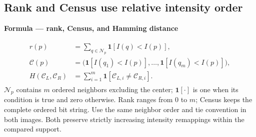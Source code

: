 \documentclass[letterpaper,11pt,english,openany,oneside]{jupyterBook}
\begin{document}
\subsection{Rank and Census use relative intensity order}
\label{\detokenize{lectures/lecture04/matching:rank-and-census-use-relative-intensity-order}}
\ignorespaces
{}\ignorespaces
{}\ignorespaces
\begin{TextbookBox}
\textbf{Formula — rank, Census, and Hamming distance}\par\smallskip
\begin{equation}\label{equation:lectures/lecture04/matching:eq-lec04-census}
\begin{split}\begin{aligned}
r(p)&=\sum_{q\in\mathcal N_p}\mathbf1[I(q)<I(p)],\\
\mathcal C(p)&=\bigl(\mathbf1[I(q_1)<I(p)],\ldots,
\mathbf1[I(q_m)<I(p)]\bigr),\\
H(\mathcal C_L,\mathcal C_R)&=\sum_{i=1}^{m}\mathbf1[\mathcal C_{L,i}\ne\mathcal C_{R,i}].
\end{aligned}\end{split}
\end{equation}
\sphinxAtStartPar
\(\mathcal N_p\) contains \(m\) ordered neighbors excluding the center; \(\mathbf1[\cdot]\) is one when its condition is true and zero otherwise. Rank ranges from \(0\) to \(m\); Census keeps the complete ordered bit string. Use the same neighbor order and tie convention in both images. Both preserve strictly increasing intensity remappings within the compared support.

\end{TextbookBox}
\end{document}
